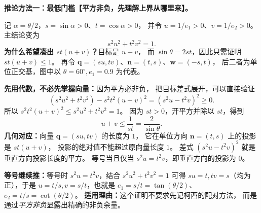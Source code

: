 \clearpage
\begin{proofbox}
\textbf{推论方法一：最低门槛【平方非负，先理解上界从哪里来】。}

记 $\alpha=\theta/2$，$s=\sin\alpha>0$、$t=\cos\alpha>0$，
并令 $u=1/e_1>0$、$v=1/e_2>0$。主结论变为
\[
 s^2u^2+t^2v^2=1.
\]
\textbf{为什么希望凑出 $st(u+v)$？}目标是 $u+v$，
而 $\sin\theta=2st$，因此只需证明 $st(u+v)\le1$。
再令 $\mathbf q=(su,tv)$、$\mathbf n=(t,s)$、$\mathbf w=(-s,t)$，
后二者为单位正交基，图中以 $\theta=60^\circ,e_1=0.9$ 为代表。

\begin{center}

\end{center}
\textbf{先用代数，不必先掌握向量：}因为平方必非负，
把目标差式展开，可以直接验证
\[
 (s^2u^2+t^2v^2)-s^2t^2(u+v)^2
   =(s^2u-t^2v)^2\ge0.
\]
所以 $s^2t^2(u+v)^2\le s^2u^2+t^2v^2=1$。
因为 $st>0$，开平方并除以 $st$，得到
\[
\boxed{u+v\le\frac1{st}=\frac2{\sin\theta}}.
\]
\textbf{几何对应：}向量 $\mathbf q=(su,tv)$ 的长度为 $1$，
它在单位方向 $\mathbf n=(t,s)$ 上的投影是 $st(u+v)$，
投影的绝对值不能超过原向量长度 $1$。
差式 $(s^2u-t^2v)^2$ 就是垂直方向投影长度的平方。
等号当且仅当 $s^2u=t^2v$，即垂直方向的投影为 $0$。

\textbf{等号继续推：}等号时 $s^2u=t^2v$，结合 $s^2u^2+t^2v^2=1$
可得 $su=t,tv=s$（均为正），于是
$u=t/s,v=s/t$，也就是 $e_1=s/t=\tan(\theta/2)$、
$e_2=t/s=\cot(\theta/2)$。
\textbf{适用理由：}这个证明不要求先记柯西的配对方法，
而是通过\emph{平方非负}显露出精确的非负余量。
\end{proofbox}

